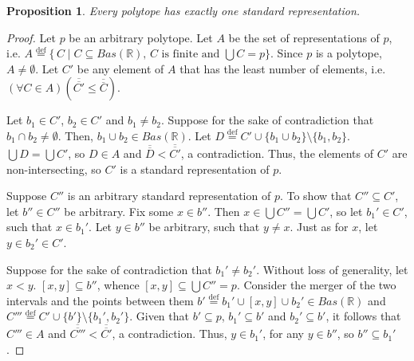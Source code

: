 \documentclass{article}
\newtheorem*{proposition}{Proposition}
\newcommand{\card}[1]{\overline{\overline{#1}}}
\newcommand{\R}{\mathbb{R}}
\newcommand{\eqdef}{\stackrel{\text{def}}{=}}
\begin{document}
\begin{proposition}
Every polytope has exactly one standard representation.
\end{proposition}
\begin{proof}
  Let $p$ be an arbitrary polytope. Let $A$ be the set of representations of $p$, i.e. $A \eqdef \{\, C \mid C \subseteq Bas(\R) \text{, } C \text{ is finite and } \bigcup C = p\}$. Since $p$ is a polytope, $A \neq \emptyset$. Let $C'$ be any element of $A$ that has the least number of elements, i.e. $(\forall C \in A)(\card{C'} \leq \card{C})$.

  Let $b_1 \in C'$, $b_2 \in C'$ and $b_1 \neq b_2$. Suppose for the sake of contradiction that $b_1 \cap b_2 \neq \emptyset$. Then, $b_1 \cup b_2 \in Bas(\R)$. Let $D \eqdef C' \cup \{b_1 \cup b_2\} \setminus \{b_1, b_2\}$. $\bigcup D = \bigcup C'$, so $D \in A$ and $\card{D} < \card{C'}$, a contradiction. Thus, the elements of $C'$ are non-intersecting, so $C'$ is a standard representation of $p$.

  Suppose $C''$ is an arbitrary standard representation of $p$. To show that $C'' \subseteq C'$, let $b'' \in C''$ be arbitrary. Fix some $x \in b''$. Then $x \in \bigcup C'' = \bigcup C'$, so let $b_1' \in C'$, such that $x \in b_1'$. Let $y \in b''$ be arbitrary, such that $y \neq x$. Just as for $x$, let $y \in b_2' \in C'$.

  \begin{figure}[ht]
    \centering
  \end{figure}
  Suppose for the sake of contradiction that $b_1' \neq b_2'$. Without loss of generality, let $x < y$. $[x, y] \subseteq b''$, whence $[x, y] \subseteq \bigcup C'' = p$. Consider the merger of the two intervals and the points between them $b' \eqdef b_1' \cup [x, y] \cup b_2' \in Bas(\R)$ and $C''' \eqdef C' \cup \{b'\} \setminus \{b_1', b_2'\}$. Given that $b' \subseteq p$, $b_1' \subseteq b'$ and $b_2' \subseteq b'$, it follows that $C''' \in A$ and $\card{C'''} < \card{C'}$, a contradiction. Thus, $y \in b_1'$, for any $y \in b''$, so $b'' \subseteq b_1'$.


\end{proof}
\end{document}
